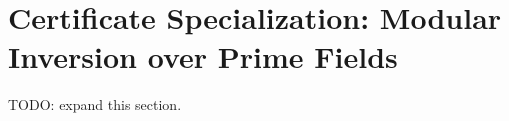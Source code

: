﻿\section{Certificate Specialization: Modular Inversion over Prime Fields}

TODO: expand this section.
